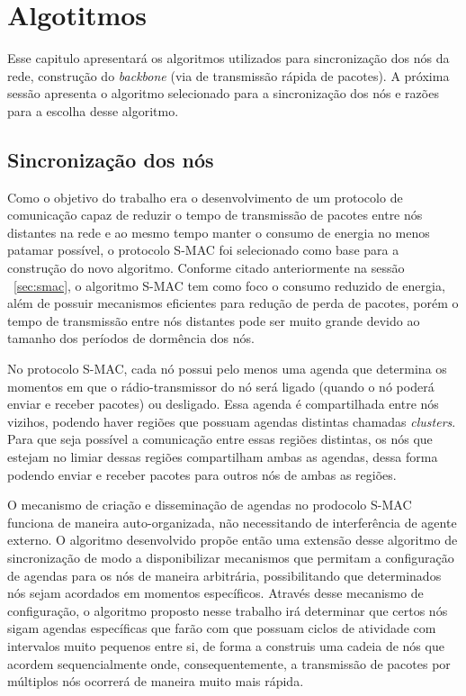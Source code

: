 \chapter{Algotitmos}

Esse capitulo apresentará os algoritmos utilizados para sincronização dos nós da rede, construção do \emph{backbone} (via de transmissão rápida de pacotes). 
A próxima sessão apresenta o algoritmo selecionado para a sincronização dos nós e razões para a escolha desse algoritmo.

\section{Sincronização dos nós}

Como o objetivo do trabalho era o desenvolvimento de um protocolo de comunicação capaz de reduzir o tempo de transmissão de pacotes entre nós distantes na rede e ao mesmo tempo manter o consumo de energia no menos patamar possível, o protocolo S-MAC\cite{ye04} foi selecionado como base para a construção do novo algoritmo. Conforme citado anteriormente na sessão ~\ref{sec:smac}, o algoritmo S-MAC tem como foco o consumo reduzido de energia, além de possuir mecanismos eficientes para redução de perda de pacotes, porém o tempo de transmissão entre nós distantes pode ser muito grande devido ao tamanho dos períodos de dormência dos nós.

No protocolo S-MAC\cite{ye04}, cada nó possui pelo menos uma agenda que determina os momentos em que o rádio-transmissor do nó será ligado (quando o nó poderá enviar e receber pacotes) ou desligado. Essa agenda é compartilhada entre nós vizihos, podendo haver regiões que possuam agendas distintas chamadas \emph{clusters}. Para que seja possível a comunicação entre essas regiões distintas, os nós que estejam no limiar dessas regiões compartilham ambas as agendas, dessa forma podendo enviar e receber pacotes para outros nós de ambas as regiões.

O mecanismo de criação e disseminação de agendas no prodocolo S-MAC funciona de maneira auto-organizada, não necessitando de interferência de agente externo. O algoritmo desenvolvido propõe então uma extensão desse algoritmo de sincronização de modo a disponibilizar mecanismos que permitam a configuração de agendas para os nós de maneira arbitrária, possibilitando que determinados nós sejam acordados em momentos específicos. Através desse mecanismo de configuração, o algoritmo proposto nesse trabalho irá determinar que certos nós sigam agendas específicas que farão com que possuam ciclos de atividade com intervalos muito pequenos entre si, de forma a construis uma cadeia de nós que acordem sequencialmente onde, consequentemente, a transmissão de pacotes por múltiplos nós ocorrerá de maneira muito mais rápida.

